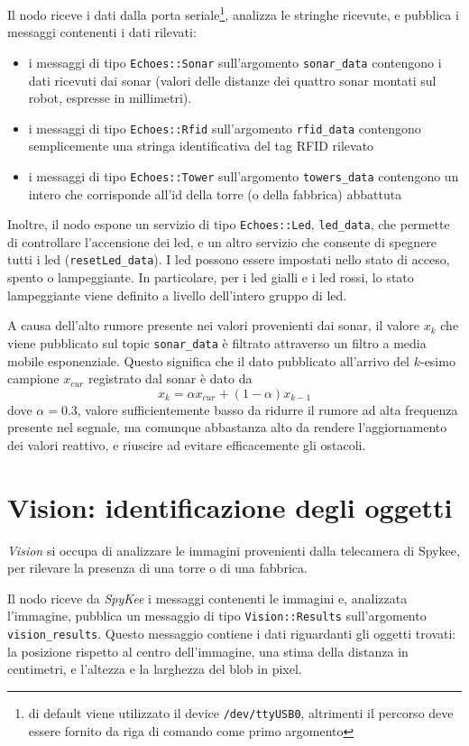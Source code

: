 Il nodo riceve i dati dalla porta seriale\footnote{di default viene utilizzato il device \texttt{/dev/ttyUSB0}, altrimenti il percorso deve essere fornito da riga di comando come primo argomento}, analizza le stringhe ricevute, e pubblica i messaggi contenenti i dati rilevati:
\begin{itemize}
	\item i messaggi di tipo \verb|Echoes::Sonar| sull'argomento \verb|sonar_data| contengono i dati ricevuti dai sonar (valori delle distanze dei quattro sonar montati sul robot, espresse in millimetri).
	\item i messaggi di tipo \verb|Echoes::Rfid| sull'argomento \verb|rfid_data| contengono semplicemente una stringa identificativa del tag RFID rilevato
	\item i messaggi di tipo \verb|Echoes::Tower| sull'argomento \verb|towers_data| contengono un intero che corrisponde all'id della torre (o della fabbrica) abbattuta
\end{itemize}
Inoltre, il nodo espone un servizio di tipo \verb|Echoes::Led|, \verb|led_data|, che permette di controllare l'accensione dei led, e un altro servizio che consente di spegnere tutti i led (\verb|resetLed_data|). I led possono essere impostati nello stato di acceso, spento o lampeggiante. In particolare, per i led gialli e i led rossi, lo stato lampeggiante viene definito a livello dell'intero gruppo di led.

A causa dell'alto rumore presente nei valori provenienti dai sonar, il valore $x_k$ che viene pubblicato sul topic \verb|sonar_data| è filtrato attraverso un filtro a media mobile esponenziale. Questo significa che il dato pubblicato all'arrivo del $k$-esimo campione $x_{cur}$ registrato dal sonar è dato da
  \[ x_k = \alpha x_{cur} + (1 - \alpha) x_{k-1} \]
dove $\alpha = 0.3$, valore sufficientemente basso da ridurre il rumore ad alta frequenza presente nel segnale, ma comunque abbastanza alto da rendere l'aggiornamento dei valori reattivo, e riuscire ad evitare efficacemente gli ostacoli.

\section{Vision: identificazione degli oggetti}

\emph{Vision} si occupa di analizzare le immagini provenienti dalla telecamera di Spykee, per rilevare la presenza di una torre o di una fabbrica. 

Il nodo riceve da \emph{SpyKee} i messaggi contenenti le immagini e, analizzata l'immagine, pubblica un messaggio di tipo \verb|Vision::Results| sull'argomento \verb|vision_results|. Questo messaggio contiene i dati riguardanti gli oggetti trovati: la posizione rispetto al centro dell'immagine, una stima della distanza in centimetri, e l'altezza e la larghezza del blob in pixel.


